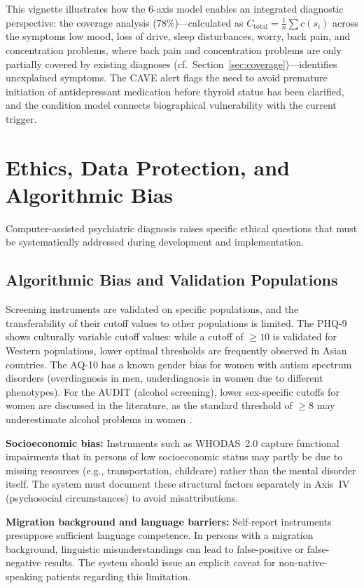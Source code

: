 \documentclass[11pt,a4paper]{article}
\begin{document}
\noindent This vignette illustrates how the 6-axis model enables an integrated diagnostic perspective: the coverage analysis (78\%)---calculated as $C_{\text{total}} = \frac{1}{n} \sum c(s_i)$ across the symptoms low mood, loss of drive, sleep disturbances, worry, back pain, and concentration problems, where back pain and concentration problems are only partially covered by existing diagnoses (cf.\ Section~\ref{sec:coverage})---identifies unexplained symptoms. The CAVE alert flags the need to avoid premature initiation of antidepressant medication before thyroid status has been clarified, and the condition model connects biographical vulnerability with the current trigger.

\section{Ethics, Data Protection, and Algorithmic Bias}
\label{sec:ethics}

Computer-assisted psychiatric diagnosis raises specific ethical questions that must be systematically addressed during development and implementation.

\subsection{Algorithmic Bias and Validation Populations}

Screening instruments are validated on specific populations, and the transferability of their cutoff values to other populations is limited. The PHQ-9 shows culturally variable cutoff values: while a cutoff of $\geq 10$ is validated for Western populations, lower optimal thresholds are frequently observed in Asian countries. The AQ-10 has a known gender bias for women with autism spectrum disorders (overdiagnosis in men, underdiagnosis in women due to different phenotypes). For the AUDIT (alcohol screening), lower sex-specific cutoffs for women are discussed in the literature, as the standard threshold of $\geq 8$ may underestimate alcohol problems in women \citep{Saunders1993}.

\textbf{Socioeconomic bias:} Instruments such as WHODAS~2.0 capture functional impairments that in persons of low socioeconomic status may partly be due to missing resources (e.g., transportation, childcare) rather than the mental disorder itself. The system must document these structural factors separately in Axis~IV (psychosocial circumstances) to avoid misattributions.

\textbf{Migration background and language barriers:} Self-report instruments presuppose sufficient language competence. In persons with a migration background, linguistic misunderstandings can lead to false-positive or false-negative results. The system should issue an explicit caveat for non-native-speaking patients regarding this limitation.
\end{document}

